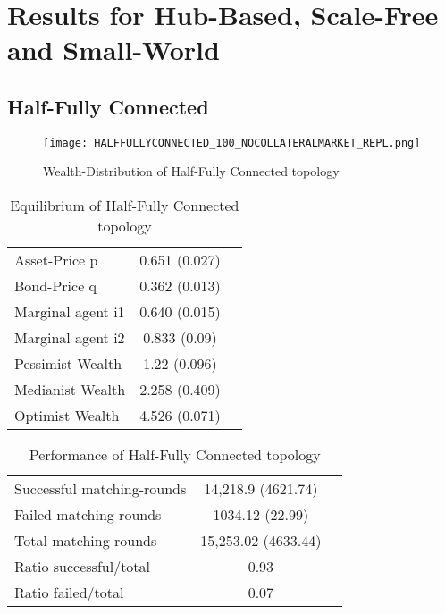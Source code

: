 \documentclass[Bachelorarbeit.tex]{subfiles}
\begin{document}
\graphicspath{{./figures/appendixResults/original/}}	%

\chapter{Results for Hub-Based, Scale-Free and Small-World}
\label{app:results}

\section{Half-Fully Connected}
\begin{figure}[H]
	\centering
  \texttt{[image: HALFFULLYCONNECTED\_100\_NOCOLLATERALMARKET\_REPL.png]}
	\caption{Wealth-Distribution of Half-Fully Connected topology }
	\label{fig:wealth_HALFFULLYCONNECTED_100_NOCOLLATERALMARKET_REPL}
\end{figure}

\begin{table}[H]
	\caption{Equilibrium of Half-Fully Connected topology}
	\centering
	\begin{tabular} { l c r }
		\hline
		Asset-Price p & 0.651 (0.027) \\
		Bond-Price q & 0.362 (0.013) \\
		Marginal agent i1 & 0.640 (0.015) \\
		Marginal agent i2 & 0.833 (0.09) \\
		\hline
		Pessimist Wealth & 1.22 (0.096) \\
		Medianist Wealth & 2.258 (0.409) \\
		Optimist Wealth & 4.526 (0.071) \\
		\hline
	\end{tabular}
\end{table} 

\begin{table}[H]
	\caption{Performance of Half-Fully Connected topology}
	\centering
	\begin{tabular} { l c r }
		\hline
		Successful matching-rounds& 14,218.9 (4621.74) \\
		Failed matching-rounds & 1034.12 (22.99) \\
		Total matching-rounds & 15,253.02 (4633.44) \\
		\hline
		Ratio successful/total & 0.93 \\
		Ratio failed/total & 0.07 \\
		\hline
	\end{tabular}
\end{table}
\end{document}
